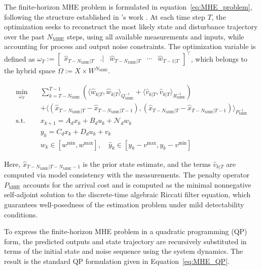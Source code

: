 The finite-horizon MHE problem is formulated in equation~\eqref{eq:MHE_problem}, following the structure established in 's work \autocite{xie2022constrained}. At each time step $T$, the optimization seeks to reconstruct the most likely state and disturbance trajectory over the past $N_{\mathrm{MHE}}$ steps, using all available measurements and inputs, while accounting for process and output noise constraints. The optimization variable is defined as $ \omega_T := \begin{bmatrix}\hat{x}_{T-N_{\mathrm{MHE}}|T} & \bigl. {} \bigr| & \hat{w}_{T-N_{\mathrm{MHE}}|T} & \cdots & \hat{w}_{T-1|T}\end{bmatrix}^\top$, which belongs to the hybrid space $\Omega := X \times W^{N_{\mathrm{MHE}}}$.

\begin{equation} \label{eq:MHE_problem}
\begin{aligned}
\min_{\omega_T} \quad & 
\sum_{k=T-N_{\mathrm{MHE}}}^{T-1} \left( \langle \hat{w}_{k|T}, \hat{w}_{k|T} \rangle_{Q_{\mathrm{MHE}}^{-1}} + \langle \hat{v}_{k|T}, \hat{v}_{k|T} \rangle_{R_{\mathrm{MHE}}^{-1}} \right) \\
&+ \langle (\hat{x}_{T{-}N_{\mathrm{MHE}}|T} - \hat{x}_{T{-}N_{\mathrm{MHE}}|T{-}1}), (\hat{x}_{T{-}N_{\mathrm{MHE}}|T} - \hat{x}_{T{-}N_{\mathrm{MHE}}|T{-}1}) \rangle_{P_{\mathrm{MHE}}^{-1}} \\
\text{s.t.} \quad
& x_{k+1} = A_d x_k + B_d u_k + \mathcal{N}_d w_k \\
& y_k = C_d x_k + D_d u_k + v_k \\
& w_k \in [w^{\min}, w^{\max}], \quad \hat{y}_k \in [y_k - v^{\max}, y_k - v^{\min}]
\end{aligned}
\end{equation}

Here, $\hat{x}_{T-N_{\mathrm{MHE}}|T-N_{\mathrm{MHE}}-1}$ is the prior state estimate, and the terms $\hat{v}_{k|T}$ are computed via model consistency with the measurements. The penalty operator $P_{\mathrm{MHE}}$ accounts for the arrival cost and is computed as the minimal nonnegative self-adjoint solution to the discrete-time algebraic Riccati filter equation\autocite{xie2022constrained}, which guarantees well-posedness of the estimation problem under mild detectability conditions.

To express the finite-horizon MHE problem in a quadratic programming (QP) form, the predicted outputs and state trajectory are recursively substituted in terms of the initial state and noise sequence using the system dynamics. The result is the standard QP formulation given in Equation~\ref{eq:MHE_QP}.

